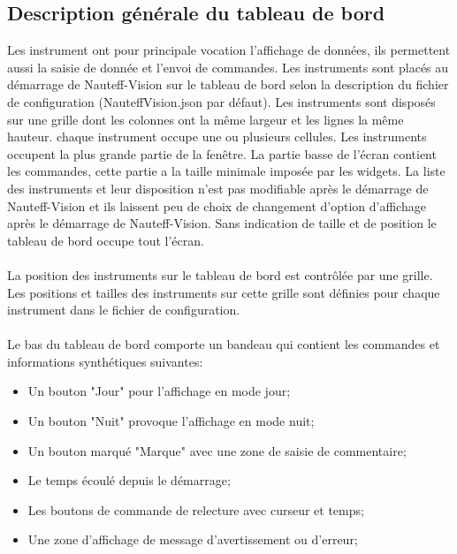 \documentclass[a4paper,11pt]{report}
\begin{document}
\subsection{Description générale du tableau de bord}
Les instrument ont pour principale vocation l'affichage de données,
ils permettent aussi la saisie de donnée et l'envoi de commandes.
Les instruments sont placés au démarrage de Nauteff-Vision
sur le tableau de bord selon la description du fichier de configuration
(NauteffVision.json par défaut).
Les instruments sont disposés sur une grille dont
les colonnes ont la même largeur et les lignes la même hauteur.
chaque instrument occupe une ou plusieurs cellules.
Les instruments occupent la plus grande partie de la fenêtre.
La partie basse de l'écran contient les commandes,
cette partie a la taille minimale imposée par les widgets.
La liste des instruments et leur disposition
n'est pas modifiable après le démarrage de Nauteff-Vision et 
ils laissent peu de choix de changement d'option d'affichage
après le démarrage de Nauteff-Vision.
Sans indication de taille et de position
le tableau de bord occupe tout l'écran.
\paragraph{}
%


\paragraph{}
La position des instruments sur le tableau de bord est contrôlée par une grille.
Les positions et tailles des instruments sur cette grille sont définies
pour chaque instrument dans le fichier de configuration.

\paragraph{}

Le bas du tableau de bord comporte un bandeau qui contient
les commandes et informations synthétiques suivantes:
\begin{itemize}
	\item Un bouton "Jour" pour l'affichage en mode jour;
	\item Un bouton "Nuit" provoque l'affichage en mode nuit;
	\item Un bouton marqué "Marque" avec une zone de saisie de commentaire;
	\item Le temps écoulé depuis le démarrage;
	\item Les boutons de commande de relecture avec curseur et temps;
	\item Une zone d'affichage de message d'avertissement ou d'erreur;
\end{itemize}
\end{document}
